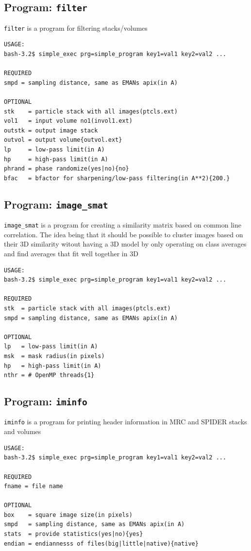 \documentclass[a4paper,11pt]{article}
\newcommand{\prgname}[1]{\textcolor{NavyBlue}{\texttt{#1}}}
\begin{document}
\subsection{Program: \prgname{filter}}
\label{filter}
\prgname{filter} is a program for filtering stacks/volumes 

\begin{verbatim}
USAGE:
bash-3.2$ simple_exec prg=simple_program key1=val1 key2=val2 ...

REQUIRED
smpd = sampling distance, same as EMANs apix(in A)

OPTIONAL
stk    = particle stack with all images(ptcls.ext)
vol1   = input volume no1(invol1.ext)
outstk = output image stack
outvol = output volume{outvol.ext}
lp     = low-pass limit(in A)
hp     = high-pass limit(in A)
phrand = phase randomize(yes|no){no}
bfac   = bfactor for sharpening/low-pass filtering(in A**2){200.}
\end{verbatim}

\subsection{Program: \prgname{image\_smat}}
\label{image_smat}
\prgname{image\_smat} is a program for creating a similarity matrix based on common line correlation. The idea being that it should be possible to cluster images based on their 3D similarity witout having a 3D model by only operating on class averages and find averages that fit well together in 3D

\begin{verbatim}
USAGE:
bash-3.2$ simple_exec prg=simple_program key1=val1 key2=val2 ...

REQUIRED
stk  = particle stack with all images(ptcls.ext)
smpd = sampling distance, same as EMANs apix(in A)

OPTIONAL
lp   = low-pass limit(in A)
msk  = mask radius(in pixels)
hp   = high-pass limit(in A)
nthr = # OpenMP threads{1}
\end{verbatim}

\subsection{Program: \prgname{iminfo}}
\label{iminfo}
\prgname{iminfo} is a program for printing header information in MRC and SPIDER stacks and volumes

\begin{verbatim}
USAGE:
bash-3.2$ simple_exec prg=simple_program key1=val1 key2=val2 ...

REQUIRED
fname = file name

OPTIONAL
box    = square image size(in pixels)
smpd   = sampling distance, same as EMANs apix(in A)
stats  = provide statistics(yes|no){yes}
endian = endiannesss of files(big|little|native){native}
\end{verbatim}
\end{document}
